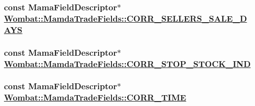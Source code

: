 \hypertarget{classWombat_1_1MamdaTradeFields_c9e9f2460c98449fbd35d329cf9e5198}{
\subsubsection[CORR\_\-SELLERS\_\-SALE\_\-DAYS]{\setlength{\rightskip}{0pt plus 5cm}const Mama\-Field\-Descriptor$\ast$ \hyperlink{classWombat_1_1MamdaTradeFields_c9e9f2460c98449fbd35d329cf9e5198}{Wombat::Mamda\-Trade\-Fields::CORR\_\-SELLERS\_\-SALE\_\-DAYS}}}
\label{classWombat_1_1MamdaTradeFields_c9e9f2460c98449fbd35d329cf9e5198}


\hypertarget{classWombat_1_1MamdaTradeFields_4980f61d0f62f5a65e88438a58b4ffd8}{
\subsubsection[CORR\_\-STOP\_\-STOCK\_\-IND]{\setlength{\rightskip}{0pt plus 5cm}const Mama\-Field\-Descriptor$\ast$ \hyperlink{classWombat_1_1MamdaTradeFields_4980f61d0f62f5a65e88438a58b4ffd8}{Wombat::Mamda\-Trade\-Fields::CORR\_\-STOP\_\-STOCK\_\-IND}}}
\label{classWombat_1_1MamdaTradeFields_4980f61d0f62f5a65e88438a58b4ffd8}


\hypertarget{classWombat_1_1MamdaTradeFields_fa751421a24f890f68730ea770f0f825}{
\subsubsection[CORR\_\-TIME]{\setlength{\rightskip}{0pt plus 5cm}const Mama\-Field\-Descriptor$\ast$ \hyperlink{classWombat_1_1MamdaTradeFields_fa751421a24f890f68730ea770f0f825}{Wombat::Mamda\-Trade\-Fields::CORR\_\-TIME}}}
\label{classWombat_1_1MamdaTradeFields_fa751421a24f890f68730ea770f0f825}


